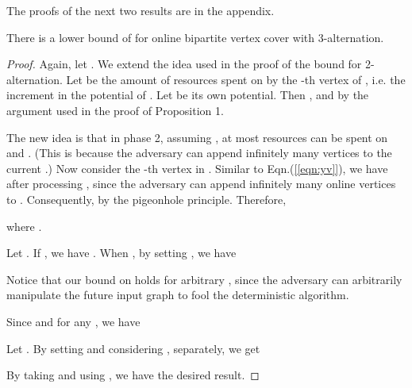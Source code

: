 \documentclass{article}
\begin{document}
The proofs of the next two results are in the appendix.
\begin{proposition}
There is a lower bound of 
for online bipartite vertex cover with 3-alternation.
\end{proposition}
\begin{proof}
Again, let . We extend the idea used in the proof of the
bound  for 2-alternation. Let  be the
amount of resources spent on  by the -th vertex of , i.e. the increment in the potential of .
Let  be its own potential. Then ,
 and  by the argument used in the proof of Proposition 1.

The new idea is that in phase 2, assuming ,  at most  resources can be spent
on  and . (This is because the adversary can append infinitely many vertices to the current .) Now consider the -th vertex  in . Similar to Eqn.(\ref{[eqn:yv]}), 
we have  after processing , since the adversary can append infinitely many online vertices to . Consequently,  by the pigeonhole principle. Therefore,


where .


Let .
If , we have . When , by setting , we have 


Notice that our bound on  holds for arbitrary , since the adversary can arbitrarily manipulate the future input graph to fool the deterministic algorithm.


Since  and  for any , we have




Let . By setting  and considering ,  separately,
we get




By taking  and using , we have the desired result.


\end{proof}
\end{document}
